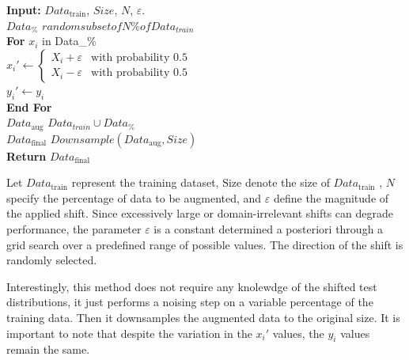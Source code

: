 \begin{algorithm}[H]
    
        \begin{algorithmic}[1]
            \STATE \textbf{Input:} $Data_{\text{train}}$, $Size$, $N$, $\varepsilon$.\\[0.5em]
         
            \State $Data_{\%}$ \leftarrow $random subset of N\% of Data_{train}$\\[0.5em]
                \textbf{For} $x_i$ in Data_{\%}\\[0.5em]
                    \State \phantom{mm} $x_i' \leftarrow 
                    \begin{cases}
                        X_i + \varepsilon & \text{with probability } 0.5 \\
                        X_i - \varepsilon & \text{with probability } 0.5
                    \end{cases}$\\[0.5em]
                    \State \phantom{mm} $y_i' \leftarrow y_i$\\[0.5em]
                \textbf{End For}\\
                \State $Data_\text{aug}$ \leftarrow $Data_{train} \cup Data_{\%}$\\
                \State $Data_\text{final}$ \leftarrow $Downsample(Data_\text{aug}, Size)$\\
            \STATE \textbf{Return} $Data_{\text{final}}$
        \end{algorithmic}
        \caption{Let $Data_{\text{train}}$ represent the training dataset, $\text{Size}$ denote the size of $Data_{\text{train}}$ , $N$ specify the percentage of data to be augmented, and $\varepsilon$ define the magnitude of the applied shift. Since excessively large or domain-irrelevant shifts can degrade performance, the parameter $\varepsilon$ is a constant determined a posteriori through a grid search over a predefined range of possible values. The direction of the shift is randomly selected.}
\end{algorithm}



Interestingly, this method does not require any knolewdge of the shifted test distributions, it just performs a noising step on a variable percentage of the training data. Then it downsamples the augmented data to the original size.
It is important to note that despite the variation in the $x_i'$ values, the $y_i$ values remain the same.

